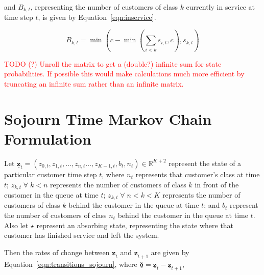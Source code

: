 \documentclass{article}
\begin{document}
and $B_{k,t}$, representing the number of customers of class $k$ currently in
service at time step $t$, is given by Equation~\ref{eqn:inservice}.

\begin{equation}\label{eqn:inservice}
B_{k,t} =\min\left(c - \min\left(\sum_{i < k} s_{i,t}, c\right), s_{k,t}\right)
\end{equation}

\textcolor{red}{TODO (?) Unroll the matrix to get a (double?) infinite sum for state probabilities. If possible this would make calculations much more efficient by truncating an infinite sum rather than an infinite matrix.}


\section{Sojourn Time Markov Chain Formulation}
Let $\underline{\mathbf{z}}_t = (z_{0,t}, z_{1,t}, \dots, z_{n,t} \dots, z_{K-1,t}, b_t, n_t) \in \mathbb{R}^{K+2}$
represent the state of a particular customer time step $t$, where $n_t$
represents that customer's class at time $t$; $z_{k,t} \; \forall \; k < n$
represents the number of customers of class $k$ in front of the customer in the
queue at time $t$; $z_{k,t} \; \forall \; n < k < K$ represents the number of
customers of class $k$ behind the customer in the queue at time $t$; and $b_t$
represent the number of customers of class $n_t$ behind the customer in the
queue at time $t$.
Also let $\star$ represent an absorbing state, representing the state where that
customer has finished service and left the system.

Then the rates of change between $\underline{\mathbf{z}}_t$ and
$\underline{\mathbf{z}}_{t+1}$ are given by Equation~\ref{eqn:transitions_sojourn},
where $\underline{\mathbf{\delta}} = \underline{\mathbf{z}}_t - \underline{\mathbf{z}}_{t+1}$,
\end{document}
